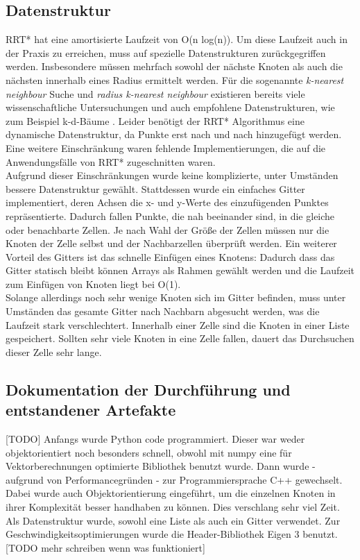 \subsection{Datenstruktur}
RRT* hat eine amortisierte Laufzeit von O(n log(n)). Um diese Laufzeit auch in der Praxis zu erreichen, muss auf spezielle Datenstrukturen zurückgegriffen werden. Insbesondere müssen mehrfach sowohl der nächste Knoten als auch die nächsten innerhalb eines Radius ermittelt werden. Für die sogenannte \textit{k-nearest neighbour} Suche und \textit{radius k-nearest neighbour} existieren bereits viele wissenschaftliche Untersuchungen und auch empfohlene Datenstrukturen, wie zum Beispiel k-d-Bäume \citep{Bentley75}. Leider benötigt der RRT* Algorithmus eine dynamische Datenstruktur, da Punkte erst nach und nach hinzugefügt werden. Eine weitere Einschränkung waren fehlende Implementierungen, die auf die Anwendungsfälle von RRT* zugeschnitten waren. \\
Aufgrund dieser Einschränkungen wurde keine komplizierte, unter Umständen bessere Datenstruktur gewählt. Stattdessen wurde ein einfaches Gitter implementiert, deren Achsen die x- und y-Werte des einzufügenden Punktes repräsentierte. Dadurch fallen Punkte, die nah beeinander sind, in die gleiche oder benachbarte Zellen. Je nach Wahl der Größe der Zellen müssen nur die Knoten der Zelle selbst und der Nachbarzellen überprüft werden. Ein weiterer Vorteil des Gitters ist das schnelle Einfügen eines Knotens: Dadurch dass das Gitter statisch bleibt können Arrays als Rahmen gewählt werden und die Laufzeit zum Einfügen von Knoten liegt bei O(1).\\
Solange allerdings noch sehr wenige Knoten sich im Gitter befinden, muss unter Umständen das gesamte Gitter nach Nachbarn abgesucht werden, was die Laufzeit stark verschlechtert. Innerhalb einer Zelle sind die Knoten in einer Liste gespeichert. Sollten sehr viele Knoten in eine Zelle fallen, dauert das Durchsuchen dieser Zelle sehr lange.



\subsection{Dokumentation der Durchführung und entstandener Artefakte}
[TODO] 
Anfangs wurde Python code programmiert. Dieser war weder objektorientiert noch besonders schnell, obwohl mit numpy eine für Vektorberechnungen optimierte Bibliothek benutzt wurde. Dann wurde - aufgrund von Performancegründen - zur Programmiersprache C++ gewechselt. Dabei wurde auch Objektorientierung eingeführt, um die einzelnen Knoten in ihrer Komplexität besser handhaben zu können. Dies verschlang sehr viel Zeit.\\
Als Datenstruktur wurde, sowohl eine Liste als auch ein Gitter verwendet. Zur Geschwindigkeitsoptimierungen wurde die Header-Bibliothek Eigen 3 benutzt. [TODO mehr schreiben wenn was funktioniert]
